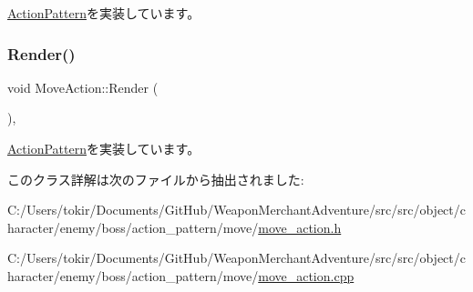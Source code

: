 \mbox{\hyperlink{class_action_pattern_ac8f2228ca469ce6fe29a9775bf393e0e}{Action\+Pattern}}を実装しています。

\mbox{\label{class_move_action_a3f427440c2409e0633ff0f6040a0320c}} 
\subsubsection{\texorpdfstring{Render()}{Render()}}
{\footnotesize\ttfamily void Move\+Action\+::\+Render (\begin{DoxyParamCaption}{ }\end{DoxyParamCaption})\hspace{0.3cm}{\ttfamily [final]}, {\ttfamily [virtual]}}



\mbox{\hyperlink{class_action_pattern_a313199aa5d15b6f9381b916ffe23fe6a}{Action\+Pattern}}を実装しています。



このクラス詳解は次のファイルから抽出されました\+:\begin{DoxyCompactItemize}
\item 
C\+:/\+Users/tokir/\+Documents/\+Git\+Hub/\+Weapon\+Merchant\+Adventure/src/src/object/character/enemy/boss/action\+\_\+pattern/move/\mbox{\hyperlink{move__action_8h}{move\+\_\+action.\+h}}\item 
C\+:/\+Users/tokir/\+Documents/\+Git\+Hub/\+Weapon\+Merchant\+Adventure/src/src/object/character/enemy/boss/action\+\_\+pattern/move/\mbox{\hyperlink{move__action_8cpp}{move\+\_\+action.\+cpp}}\end{DoxyCompactItemize}
